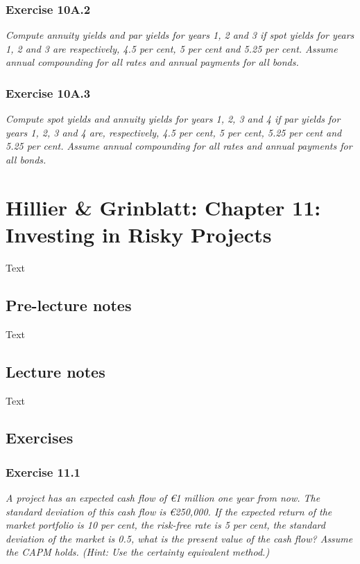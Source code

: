 \documentclass[]{book}
\newcommand{\euro}{€}
\theoremstyle{definition}
\theoremstyle{definition}
\theoremstyle{remark}
\begin{document}
\subsection{Exercise 10A.2}\label{exercise-10a.2}

\emph{Compute annuity yields and par yields for years 1, 2 and 3 if spot
yields for years 1, 2 and 3 are respectively, 4.5 per cent, 5 per cent
and 5.25 per cent. Assume annual compounding for all rates and annual
payments for all bonds.} \citep[p.347]{book}

\subsection{Exercise 10A.3}\label{exercise-10a.3}

\emph{Compute spot yields and annuity yields for years 1, 2, 3 and 4 if
par yields for years 1, 2, 3 and 4 are, respectively, 4.5 per cent, 5
per cent, 5.25 per cent and 5.25 per cent. Assume annual compounding for
all rates and annual payments for all bonds.} \citep[p.347]{book}

\chapter{Hillier \& Grinblatt: Chapter 11: Investing in Risky
Projects}\label{hillier-grinblatt-chapter-11-investing-in-risky-projects}

Text

\section{Pre-lecture notes}\label{pre-lecture-notes-10}

Text

\section{Lecture notes}\label{lecture-notes-10}

Text

\section{Exercises}\label{exercises-10}

\subsection{Exercise 11.1}\label{exercise-11.1}

\emph{A project has an expected cash flow of \euro{}1 million one year
from now. The standard deviation of this cash flow is \euro{}250,000. If
the expected return of the market portfolio is 10 per cent, the
risk-free rate is 5 per cent, the standard deviation of the market is
0.5, what is the present value of the cash flow? Assume the CAPM holds.
(Hint: Use the certainty equivalent method.)} \citep[p.389]{book}
\end{document}
